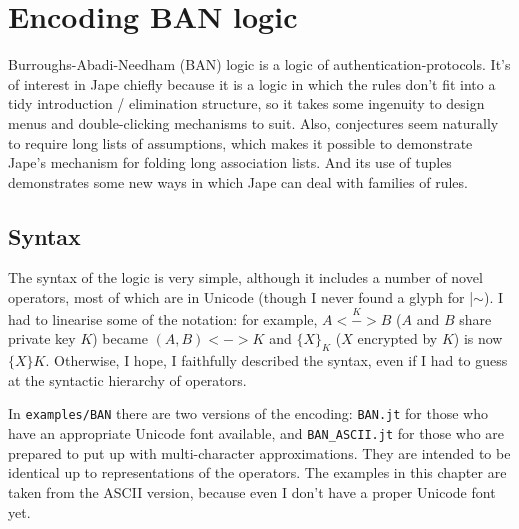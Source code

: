 \chapter{Encoding BAN logic}
\label{chap:BAN}

Burroughs-Abadi-Needham (BAN) logic is a logic of authentication-protocols. It's of interest in Jape chiefly because it is a logic in which the rules don't fit into a tidy introduction / elimination structure, so it takes some ingenuity to design menus and double-clicking mechanisms to suit. Also, conjectures seem naturally to require long lists of assumptions, which makes it possible to demonstrate Jape's mechanism for folding long association lists. And its use of tuples demonstrates some new ways in which Jape can deal with families of rules.

\section{Syntax}

The syntax of the logic is very simple, although it includes a number of novel operators, most of which are in Unicode (though I never found a glyph for |$\sim$). I had to linearise some of the notation: for example, $A\overset{K}{<->}B$ ($A$ and $B$ share private key $K$) became $( A,B)<->K$ and $\{ X\}_{K}$ ($X$ encrypted by $K$) is now $\{X\}K$. Otherwise, I hope, I faithfully described the syntax, even if I had to guess at the syntactic hierarchy of operators.

In \texttt{examples/BAN} there are two versions of the encoding: \texttt{BAN.jt} for those who have an appropriate Unicode font available, and \texttt{BAN\_ASCII.jt} for those who are prepared to put up with multi-character approximations. They are intended to be identical up to representations of the operators. The examples in this chapter are taken from the ASCII version, because even I don't have a proper Unicode font yet.

